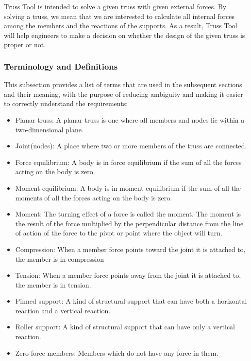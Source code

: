 \documentclass[12pt]{article}
\begin{document}
Truss Tool is intended to solve a given truss with given external forces. By solving a truss, we mean that we are interested to calculate all internal forces among the members and the reactions of the supports. As a result, Truss Tool will help engineers to make a decision on whether the design of the given truss is proper or not.


\subsubsection{Terminology and  Definitions}


This subsection provides a list of terms that are used in the subsequent
sections and their meaning, with the purpose of reducing ambiguity and making it easier to correctly understand the requirements:

\begin{itemize}

\item{ Planar truss:  A planar truss is one where all members and nodes lie within a two-dimensional plane.} 
\item{Joint(nodes): A place where two or more  members of the truss  are connected.}
\item{Force equilibrium: A body is in force equilibrium if the sum of all the forces acting on the body is zero.}
\item{Moment equilibrium: A body is in moment equilibrium if the sum of all the moments of all the forces acting on the body is zero.}
\item{Moment: The turning effect of a force is called the moment. The moment is the result of the force multiplied by the perpendicular distance from the line of action of the force to the pivot or point where the object will turn.}
\item{Compression: When a member force points toward the joint it is attached to, the member is in compression}
\item{Tension: When a member force points away from the joint it is attached to, the member is in tension.}
\item{Pinned support: A kind of structural support that can have both a horizontal reaction and a vertical reaction. }
\item{Roller support: A kind of structural support that can have only a vertical reaction. }
\item{Zero force members: Members which do not have any force in them.}
\end{itemize}
\end{document}
